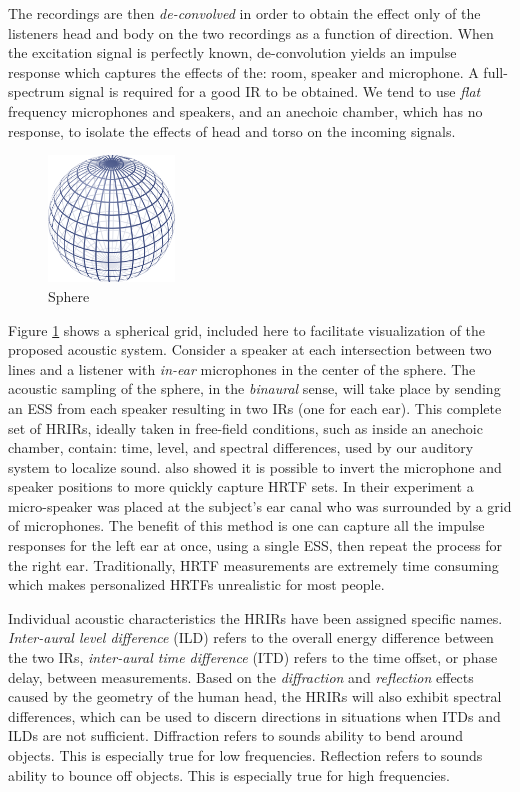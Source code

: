 The recordings are then \textit{de-convolved} in order to obtain the effect only of the listeners head and body on the two recordings as a function of direction. When the excitation signal is perfectly known, de-convolution yields an impulse response which captures the effects of the: room, speaker and microphone. A full-spectrum signal is required for a good IR to be obtained. We tend to use \textit{flat} frequency microphones and speakers, and an anechoic chamber, which has no response, to isolate the effects of head and torso on the incoming signals. 

\begin{figure}[ht!]%
\centering
\includegraphics[width=0.3\textwidth]{img/sphere-png.png} 
\caption{Sphere \cite{Spherewi43:online}}
\label{fig:sphere}
\end{figure}

Figure \ref{fig:sphere} shows a spherical grid, included here to facilitate visualization of the proposed acoustic system. Consider a speaker at each intersection between two lines and a listener with \textit{in-ear} microphones in the center of the sphere. The acoustic sampling of the sphere, in the \textit{binaural} sense, will take place by sending an ESS from each speaker resulting in two IRs (one for each ear). This complete set of HRIRs, ideally taken in free-field conditions, such as inside an anechoic chamber, contain: time, level, and spectral differences, used by our auditory system to localize sound. \cite{zotkin2006fast} also showed it is possible to invert the microphone and speaker positions to more quickly capture HRTF sets. In their experiment a micro-speaker was placed at the subject's ear canal who was surrounded by a grid of microphones. The benefit of this method is one can capture all the impulse responses for the left ear at once, using a single ESS, then repeat the process for the right ear. Traditionally, HRTF measurements are extremely time consuming which makes personalized HRTFs unrealistic for most people.

Individual acoustic characteristics the HRIRs have been assigned specific names. \textit{Inter-aural level difference} (ILD) refers to the overall energy difference between the two IRs, \textit{inter-aural time difference} (ITD) refers to the time offset, or phase delay, between measurements. Based on the \textit{diffraction} and \textit{reflection} effects caused by the geometry of the human head, the HRIRs will also exhibit spectral differences, which can be used to discern directions in situations when ITDs and ILDs are not sufficient. Diffraction refers to sounds ability to bend around objects. This is especially true for low frequencies. Reflection refers to sounds ability to bounce off objects. This is especially true for high frequencies.

